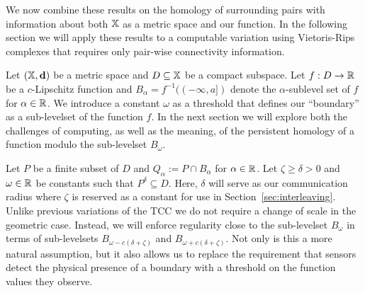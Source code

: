 

We now combine these results on the homology of surrounding pairs with information about both $\mathbb{X}$ as a metric space and our function.
In the following section we will apply these results to a computable variation using Vietoris-Rips complexes that requires only pair-wise connectivity information.

Let $(\mathbb{X},\mathbf{d})$ be a metric space and $D\subseteq \mathbb{X}$ be a compact subspace.
Let $f : D\to \mathbb{R}$ be a $c$-Lipschitz function and $B_\alpha = f^{-1}((-\infty, a])$ denote the $\alpha$-sublevel set of $f$ for $\alpha\in\mathbb{R}$.
We introduce a constant $\omega$ as a threshold that defines our ``boundary'' as a sub-levelset of the function $f$.
In the next section we will explore both the challenges of computing, as well as the meaning, of the persistent homology of a function modulo the sub-levelset $B_\omega$.

Let $P$ be a finite subset of $D$ and $Q_\alpha := P\cap B_\alpha$ for $\alpha\in\mathbb{R}$.
Let $\zeta\geq\delta > 0 $ and $\omega\in \mathbb{R}$ be constants such that $P^\delta\subseteq D$.
Here, $\delta$ will serve as our communication radius where $\zeta$ is reserved as a constant for use in Section~\ref{sec:interleaving}.
Unlike previous variations of the TCC we do not require a change of scale in the geometric case.
Instead, we will enforce regularity close to the sub-levelset $B_\omega$ in terms of sub-levelsets $B_{\omega-c(\delta+\zeta)}$ and $B_{\omega+c(\delta+\zeta)}$.
Not only is this a more natural assumption, but it also allows us to replace the requirement that sensors detect the physical presence of a boundary with a threshold on the function values they observe.

